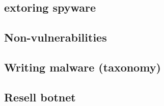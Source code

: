\subsection{extoring spyware}


\subsection{Non-vulnerabilities}


\subsection{Writing malware (taxonomy)}


\subsection{Resell botnet}

